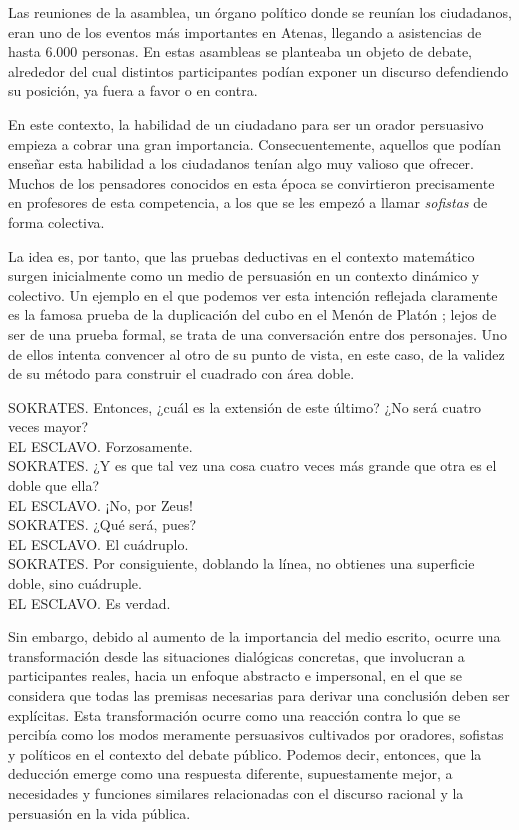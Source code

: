 \documentclass{article}
\begin{document}
Las reuniones de la asamblea, un órgano político donde se reunían los ciudadanos, eran uno de los eventos más importantes en Atenas, llegando a asistencias de hasta 6.000 personas. En estas asambleas se planteaba un objeto de debate, alrededor del cual distintos participantes podían exponer un discurso defendiendo su posición, ya fuera a favor o en contra.

En este contexto, la habilidad de un ciudadano para ser un orador persuasivo empieza a cobrar una gran importancia. Consecuentemente, aquellos que podían enseñar esta habilidad a los ciudadanos tenían algo muy valioso que ofrecer. Muchos de los pensadores conocidos en esta época se convirtieron precisamente en profesores de esta competencia, a los que se les empezó a llamar \textit{sofistas} de forma colectiva.

La idea es, por tanto, que las pruebas deductivas en el contexto matemático surgen inicialmente como un medio de persuasión en un contexto dinámico y colectivo. Un ejemplo en el que podemos ver esta intención reflejada claramente es la famosa prueba de la duplicación del cubo en el Menón de Platón \cite{novaes2020dialogical}; lejos de ser de una prueba formal, se trata de una conversación entre dos personajes. Uno de ellos intenta convencer al otro de su punto de vista, en este caso, de la validez de su método para construir el cuadrado con área doble.

\begin{displayquote}
SOKRATES. Entonces, ¿cuál es la extensión de este último? ¿No será cuatro veces mayor?\\
EL ESCLAVO. Forzosamente.\\
SOKRATES. ¿Y es que tal vez una cosa cuatro veces más grande que otra es el doble que ella?\\
EL ESCLAVO. ¡No, por Zeus!\\
SOKRATES. ¿Qué será, pues?\\
EL ESCLAVO. El cuádruplo.\\
SOKRATES. Por consiguiente, doblando la línea, no obtienes una superficie doble, sino cuádruple.\\
EL ESCLAVO. Es verdad. \cite{bergua1958dialogos}
\end{displayquote}

Sin embargo, debido al aumento de la importancia del medio escrito, ocurre una transformación desde las situaciones dialógicas concretas, que involucran a participantes reales, hacia un enfoque abstracto e impersonal, en el que se considera que todas las premisas necesarias para derivar una conclusión deben ser explícitas. Esta transformación ocurre como una reacción contra lo que se percibía como los modos meramente persuasivos cultivados por oradores, sofistas y políticos en el contexto del debate público. Podemos decir, entonces, que la deducción emerge como una respuesta diferente, supuestamente mejor, a necesidades y funciones similares relacionadas con el discurso racional y la persuasión en la vida pública. \cite{novaes2020dialogical}
\end{document}
